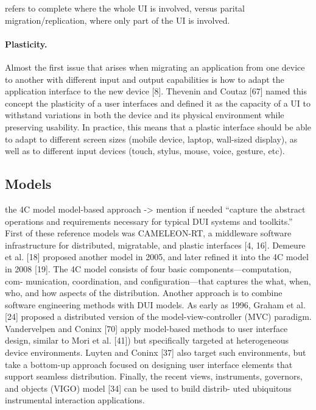 \cite{blumendorf2011distributed} refers to complete where the whole UI is
involved,  versus parital migration/replication, where only part of the UI is
involved.

\paragraph{Plasticity.}
\cite{elmqvist2011distributed} Almost the first issue that arises when migrating
an application from one device to another with different input and output capabilities is how to adapt the application interface to the new device [8]. Thevenin and Coutaz [67] named this concept the plasticity of a user interfaces and defined it as the capacity of a UI to withstand variations in both the device and its physical environment while preserving usability. In practice, this means that a plastic interface should be able to adapt to different screen sizes (mobile device, laptop, wall-sized display), as well as to different input devices (touch, stylus, mouse, voice, gesture, etc).

\subsection{Models}
\cite{demeure20084c} the 4C model
\cite{melchior2011distributed} model-based approach -> mention if needed
\cite{elmqvist2011distributed} ``capture the abstract operations and 
requirements necessary for typical DUI systems and toolkits.'' \\
\cite{elmqvist2011distributed} First of these reference models was CAMELEON-RT,
a middleware software infrastructure for distributed, migratable, and plastic interfaces [4, 16]. Demeure et al. [18] proposed another model in 2005, and later refined it into the 4C model in 2008 [19]. The 4C model consists of four basic components—computation, com- munication, coordination, and configuration—that captures the what, when, who, and how aspects of the distribution.
Another approach is to combine software engineering methods with DUI models. As early as 1996, Graham et al. [24] proposed a distributed version of the model-view-controller (MVC) paradigm. Vandervelpen and Coninx [70] apply model-based methods to user interface design, similar to Mori et al. [41]) but specifically targeted at heterogeneous device environments. Luyten and Coninx [37] also target such environments, but take a bottom-up approach focused on designing user interface elements that support seamless distribution. Finally, the recent views, instruments, governors, and objects (VIGO) model [34] can be used to build distrib- uted ubiquitous instrumental interaction applications.


